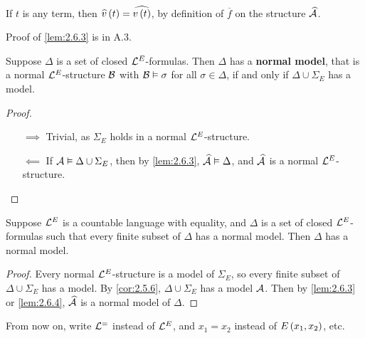 \begin{note}
If $ t $ is any term, then $ \widehat{v}\rb{t} = \widehat{v\rb{t}} $, by definition of $ \overline{f} $ on the structure $ \widehat{\AA} $.
\end{note}

Proof of \ref{lem:2.6.3} is in A.3.

\begin{lemma}
\label{lem:2.6.4}
Suppose $ \Delta $ is a set of closed $ \LL^E $-formulas. Then $ \Delta $ has a \textbf{normal model}, that is a normal $ \LL^E $-structure $ \BB $ with $ \BB \vDash \sigma $ for all $ \sigma \in \Delta $, if and only if $ \Delta \cup \Sigma_E $ has a model.
\end{lemma}

\begin{proof}
\hfill
\begin{itemize}
\item[$ \implies $] Trivial, as $ \Sigma_E $ holds in a normal $ \LL^E $-structure.
\item[$ \impliedby $] If $ \AA \vDash \Delta \cup \Sigma_E $, then by \ref{lem:2.6.3}, $ \widehat{\AA} \vDash \Delta $, and $ \widehat{\AA} $ is a normal $ \LL^E $-structure.
\end{itemize}
\end{proof}

\begin{theorem}
Suppose $ \LL^E $ is a countable language with equality, and $ \Delta $ is a set of closed $ \LL^E $-formulas such that every finite subset of $ \Delta $ has a normal model. Then $ \Delta $ has a normal model.
\end{theorem}

\begin{proof}
Every normal $ \LL^E $-structure is a model of $ \Sigma_E $, so every finite subset of $ \Delta \cup \Sigma_E $ has a model. By \ref{cor:2.5.6}, $ \Delta \cup \Sigma_E $ has a model $ \AA $. Then by \ref{lem:2.6.3} or \ref{lem:2.6.4}, $ \widehat{\AA} $ is a normal model of $ \Delta $.
\end{proof}

\begin{notation2}
From now on, write $ \LL^= $ instead of $ \LL^E $, and $ x_1 = x_2 $ instead of $ E\rb{x_1, x_2} $, etc.
\end{notation2}

\pagebreak


